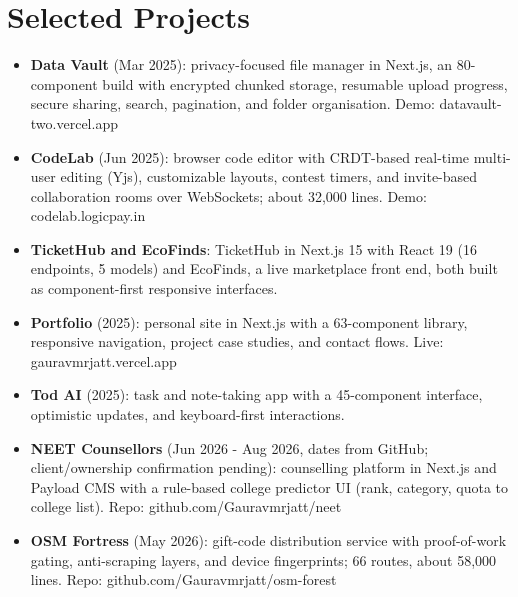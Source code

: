 \documentclass[11pt,a4paper,sans]{moderncv}
\begin{document}
\section{Selected Projects}
\vspace{1pt}
\begin{itemize}
    \item {\textbf{Data Vault} (Mar 2025): privacy-focused file manager in Next.js, an 80-component build with encrypted chunked storage, resumable upload progress, secure sharing, search, pagination, and folder organisation. Demo: datavault-two.vercel.app}
    \item {\textbf{CodeLab} (Jun 2025): browser code editor with CRDT-based real-time multi-user editing (Yjs), customizable layouts, contest timers, and invite-based collaboration rooms over WebSockets; about 32,000 lines. Demo: codelab.logicpay.in}
    \item {\textbf{TicketHub and EcoFinds}: TicketHub in Next.js 15 with React 19 (16 endpoints, 5 models) and EcoFinds, a live marketplace front end, both built as component-first responsive interfaces.}
    \item {\textbf{Portfolio} (2025): personal site in Next.js with a 63-component library, responsive navigation, project case studies, and contact flows. Live: gauravmrjatt.vercel.app}
    \item {\textbf{Tod AI} (2025): task and note-taking app with a 45-component interface, optimistic updates, and keyboard-first interactions.}
    \item {\textbf{NEET Counsellors} (Jun 2026 - Aug 2026, dates from GitHub; client/ownership confirmation pending): counselling platform in Next.js and Payload CMS with a rule-based college predictor UI (rank, category, quota to college list). Repo: github.com/Gauravmrjatt/neet}
    \item {\textbf{OSM Fortress} (May 2026): gift-code distribution service with proof-of-work gating, anti-scraping layers, and device fingerprints; 66 routes, about 58,000 lines. Repo: github.com/Gauravmrjatt/osm-forest}
\end{itemize}


\enlargethispage{3\baselineskip}
\end{document}
